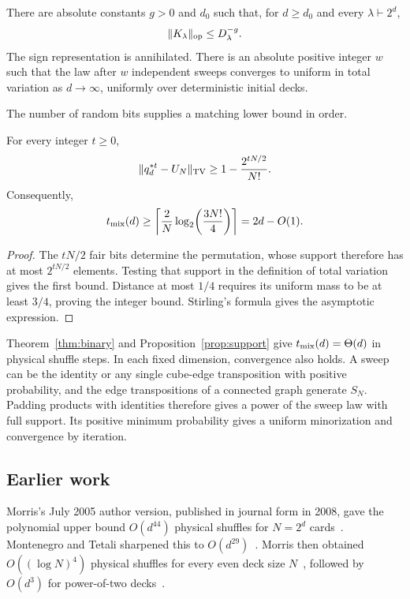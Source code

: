 \begin{theorem}\label{thm:binary}
There are absolute constants \(g>0\) and \(d_0\) such that, for \(d\ge d_0\)
and every \(\lambda\vdash 2^d\),
\[
 \|K_\lambda\|_{\mathrm{op}}\le D_\lambda^{-g}.
\]
The sign representation is annihilated. There is an absolute positive integer \(w\)
such that the law after \(w\) independent sweeps converges to uniform in
total variation as \(d\to\infty\), uniformly over deterministic initial
decks.
\end{theorem}

The number of random bits supplies a matching lower bound in order.

\begin{proposition}\label{prop:support}
For every integer \(t\ge0\),
\[
 \|q_d^{*t}-U_N\|_{\mathrm{TV}}\ge1-\frac{2^{tN/2}}{N!}.
\]
Consequently,
\[
 t_{\rm mix}(d)\ge
 \left\lceil\frac2N\log_2\!\left(\frac{3N!}{4}\right)\right\rceil
 =2d-O(1).
\]
\end{proposition}
\begin{proof}
The \(tN/2\) fair bits determine the permutation, whose support therefore
has at most \(2^{tN/2}\) elements. Testing that support in the definition
of total variation gives the first bound. Distance at most \(1/4\)
requires its uniform mass to be at least \(3/4\), proving the integer
bound. Stirling's formula gives the asymptotic expression.
\end{proof}

Theorem~\ref{thm:binary} and Proposition~\ref{prop:support} give
\(t_{\rm mix}(d)=\Theta(d)\) in physical shuffle steps. In each fixed
dimension, convergence also holds. A sweep can be the identity or any
single cube-edge transposition with positive probability, and the edge
transpositions of a connected graph generate \(S_N\). Padding products
with identities therefore gives a power of the sweep law with full
support. Its positive minimum probability gives a uniform minorization
and convergence by iteration.

\subsection{Earlier work}

Morris's July 2005 author version, published in journal form in 2008,
gave the polynomial upper bound \(O(d^{44})\) physical shuffles for
\(N=2^d\) cards~\cite{Morris2008}. Montenegro and Tetali sharpened this
to \(O(d^{29})\)~\cite{MontenegroTetali2006}. Morris then obtained
\(O((\log N)^4)\) physical shuffles for every even deck size
\(N\)~\cite{Morris2009}, followed by \(O(d^3)\) for power-of-two
decks~\cite{Morris2013}.

